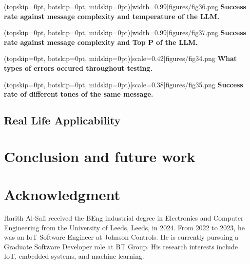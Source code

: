 \documentclass{ieeeaccess}
\begin{document}
\Figure[t!](topskip=0pt, botskip=0pt,
midskip=0pt)[width=0.99\columnwidth]{{figures/fig36.png}}
{ \textbf{Success rate against message complexity and temperature of the LLM.}\label{fig10}}

\Figure[t!](topskip=0pt, botskip=0pt,
midskip=0pt)[width=0.99\columnwidth]{{figures/fig37.png}}
{ \textbf{Success rate against message complexity and Top P of the LLM.}\label{fig11}}

\Figure[t!](topskip=0pt, botskip=0pt,
midskip=0pt)[scale=0.42]{{figures/fig34.png}}
{ \textbf{What types of errors occured throughout testing.}\label{fig12}}

\Figure[t!](topskip=0pt, botskip=0pt,
midskip=0pt)[scale=0.38]{{figures/fig35.png}}
{ \textbf{Success rate of different tones of the same message.}\label{fig13}}

\subsection{Real Life Applicability}

\section{Conclusion and future work}
\label{sec:conclusion}

\section*{Acknowledgment}




\begin{IEEEbiography}{Harith Al-Safi} received the BEng industrial degree in Electronics and Computer Engineering from
    the University of Leeds, Leeds, in 2024. From 2022 to 2023, he was an IoT Software Engineer at Johnson Controls. He is currently pursuing a Graduate Software Developer role at BT Group. His research interests include IoT, embedded systems, and machine learning.
\end{IEEEbiography}
\end{document}
